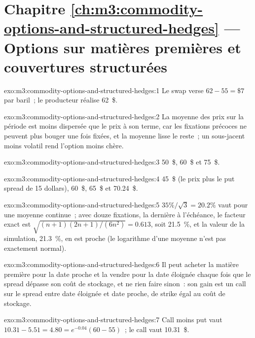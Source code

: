 \section*{Chapitre \ref{ch:m3:commodity-options-and-structured-hedges} --- Options sur matières premières et couvertures structurées}

\begin{solution}{exo:m3:commodity-options-and-structured-hedges:1}
Le swap verse $62 - 55 = \$7$ par baril~; le producteur réalise 62~\$.
\end{solution}

\begin{solution}{exo:m3:commodity-options-and-structured-hedges:2}
La moyenne des prix sur la période est moins dispersée que le prix à son terme, car les fixations précoces
ne peuvent plus bouger une fois fixées, et la moyenne lisse le reste~; un sous-jacent moins volatil rend
l'option moins chère.
\end{solution}

\begin{solution}{exo:m3:commodity-options-and-structured-hedges:3}
50~\$, 60~\$ et 75~\$.
\end{solution}

\begin{solution}{exo:m3:commodity-options-and-structured-hedges:4}
45~\$ (le prix plus le put spread de 15 dollars), 60~\$, 65~\$ et 70.24~\$.
\end{solution}

\begin{solution}{exo:m3:commodity-options-and-structured-hedges:5}
$35\%/\sqrt3 = 20.2\%$ vaut pour une moyenne continue~; avec douze fixations, la dernière à l'échéance, le
facteur exact est $\sqrt{(n+1)(2n+1)/(6n^2)} = 0.613$, soit 21.5~\%, et la valeur de la simulation, 21.3~\%, en est proche (le
logarithme d'une moyenne n'est pas exactement normal).
\end{solution}

\begin{solution}{exo:m3:commodity-options-and-structured-hedges:6}
Il peut acheter la matière première pour la date proche et la vendre pour la date éloignée chaque fois que le spread dépasse son
coût de stockage, et ne rien faire sinon~: son gain est un call sur le spread entre date éloignée et date proche,
de strike égal au coût de stockage.
\end{solution}

\begin{solution}{exo:m3:commodity-options-and-structured-hedges:7}
Call moins put vaut $10.31 - 5.51 = 4.80 = e^{-0.04}(60 - 55)$~; le call vaut 10.31~\$.
\end{solution}

